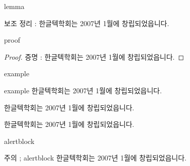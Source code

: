 \documentclass[10pt,blue,xcolor=pdftex,dvipsnames,table,handout]{beamer}
\begin{document}
		\begin{frame}[t]{lemma}

			\begin{lemma}
			보조 정리 :  한글텍학회는 2007년 1월에 창립되었읍니다.	
			\end{lemma}

		\end{frame}


		\begin{frame}[t]{proof}

			\begin{proof}
			증명 : 한글텍학회는 2007년 1월에 창립되었읍니다.	
			\end{proof}

		\end{frame}


		\begin{frame}[t]{example}

			\begin{example} {example}
			한글텍학회는 2007년 1월에 창립되었읍니다.	
			\end{example}

			\begin{example} {}
			한글텍학회는 2007년 1월에 창립되었읍니다.	
			\end{example}

			\begin{example}
			한글텍학회는 2007년 1월에 창립되었읍니다.	
			\end{example}


		\end{frame}


		\begin{frame}[t]{alertblock}

			\begin{alertblock} {주의 ; alertblock}
			한글텍학회는 2007년 1월에 창립되었읍니다.	
			\end{alertblock}

		\end{frame}
\end{document}

